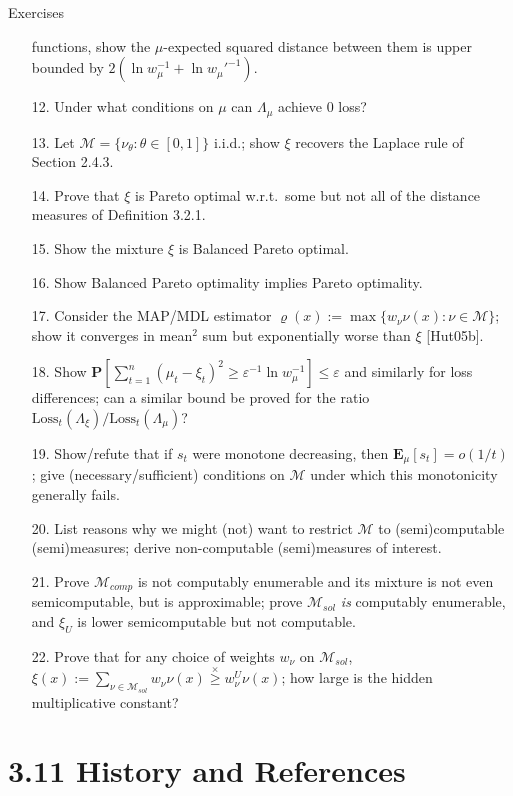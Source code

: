 \documentclass[aspectratio=169,10pt]{beamer}
\newcommand{\Mcal}{\mathcal{M}}
\newcommand{\Loss}{\mathrm{Loss}}
\begin{document}
\begin{frame}[allowframebreaks]{Exercises}
\begin{enumerate}
      functions, show the $\mu$-expected squared distance between them is
      upper bounded by $2(\ln w_\mu^{-1}+\ln w_\mu'^{-1})$.
    \item[12.] Under what conditions on $\mu$ can $\Lambda_\mu$ achieve $0$ loss?
    \item[13.] Let $\Mcal=\{\nu_\theta:\theta\in[0,1]\}$ i.i.d.; show $\xi$
      recovers the Laplace rule of Section 2.4.3.
    \item[14.] Prove that $\xi$ is Pareto optimal w.r.t.\ some but not all of
      the distance measures of Definition 3.2.1.
    \item[15.] Show the mixture $\xi$ is Balanced Pareto optimal.
    \item[16.] Show Balanced Pareto optimality implies Pareto optimality.
    \item[17.] Consider the MAP/MDL estimator
      $\varrho(x):=\max\{w_\nu\nu(x):\nu\in\Mcal\}$; show it converges in
      mean$^2$ sum but exponentially worse than $\xi$ [Hut05b].
    \item[18.] Show
      $\mathbf{P}[\sum_{t=1}^n(\mu_t-\xi_t)^2\ge\varepsilon^{-1}\ln w_\mu^{-1}]\le\varepsilon$
      and similarly for loss differences; can a similar bound be proved for
      the ratio $\Loss_t(\Lambda_\xi)/\Loss_t(\Lambda_\mu)$?
    \item[19.] Show/refute that if $s_t$ were monotone decreasing, then
      $\mathbf{E}_\mu[s_t]=o(1/t)$; give (necessary/sufficient) conditions
      on $\Mcal$ under which this monotonicity generally fails.
    \item[20.] List reasons why we might (not) want to restrict $\Mcal$ to
      (semi)computable (semi)measures; derive non-computable (semi)measures
      of interest.
    \item[21.] Prove $\Mcal_{comp}$ is not computably enumerable and its
      mixture is not even semicomputable, but is approximable; prove
      $\Mcal_{sol}$ \emph{is} computably enumerable, and $\xi_U$ is lower
      semicomputable but not computable.
    \item[22.] Prove that for any choice of weights $w_\nu$ on $\Mcal_{sol}$,
      $\xi(x):=\sum_{\nu\in\Mcal_{sol}}w_\nu\nu(x) \overset{\times}{\ge}
      w_\nu^U\nu(x)$; how large is the hidden multiplicative constant?
  \end{enumerate}
\end{frame}

\section{3.11 History and References}
\end{document}
